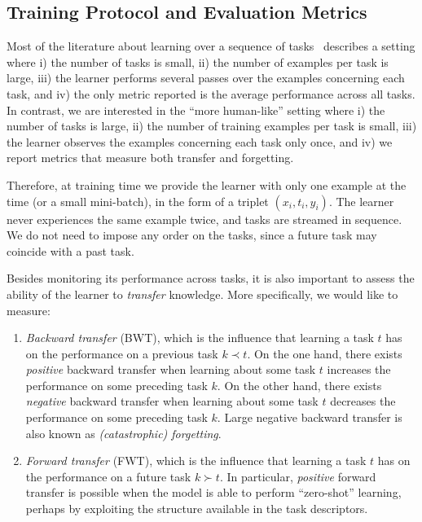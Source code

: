 \documentclass{article}
\begin{document}
\subsection*{Training Protocol and Evaluation Metrics} Most of the literature
about learning over a sequence of tasks~\citep{progressive, pathnet, ewc,
icarl} describes a setting where i) the number of tasks is small, ii) the
number of examples per task is large, iii) the learner performs several passes
over the examples concerning each task, and iv) the only metric reported is the
average performance across all tasks.  In contrast, we are interested in the
``more human-like'' setting where i) the number of tasks is large, ii) the
number of training examples per task is small, iii) the learner observes the
examples concerning each task only once, and iv) we report metrics that measure
both transfer and forgetting.

Therefore, at training time we provide the learner with only one example at the
time (or a small mini-batch), in the form of a triplet $(x_i, t_i, y_i)$. The
learner never experiences the same example twice, and tasks are streamed in
sequence. We do not need to impose any order on the tasks, since a future task
may coincide with a past task.

Besides monitoring its performance across tasks, it is also important to assess
the ability of the learner to {\em transfer} knowledge. More specifically, we
would like to measure:
\begin{enumerate}
  \item \emph{Backward transfer} (BWT), which is the influence that learning a
  task $t$ has on the performance on a previous task $k \prec t$. On the one
  hand, there exists \emph{positive} backward transfer when learning about some
  task $t$ increases the performance on some preceding task $k$. On the other
  hand, there exists \emph{negative} backward transfer when learning about some
  task $t$ decreases the performance on some preceding task $k$. Large negative
  backward transfer is also known as \emph{(catastrophic) forgetting}. 
  \item \emph{Forward transfer} (FWT), which is the influence that learning a
  task $t$ has on the performance on a future task $k \succ t$. In particular,
  \emph{positive} forward transfer is possible when the model is able to
  perform ``zero-shot'' learning, perhaps by exploiting the structure available
  in the task descriptors. 
\end{enumerate}
\end{document}
